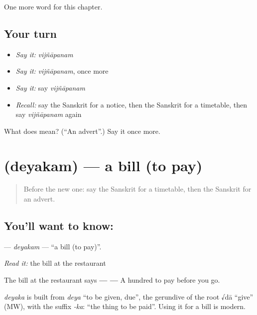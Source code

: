 \begin{grammarlens}[title={What you've built}]
One more word for this chapter.
\end{grammarlens}

\subsection*{Your turn}
\begin{itemize}
\raggedright
  \item \emph{Say it:} \emph{vijñāpanam}
  \item \emph{Say it:} \emph{vijñāpanam}, once more
  \item \emph{Say it:} say \emph{vijñāpanam}
  \item \emph{Recall:} say the Sanskrit for a notice, then the Sanskrit for a timetable, then say \emph{vijñāpanam} again
\end{itemize}

\begin{tcolorbox}[breakable,colback=teal!4,colframe=teal!35!black,title={Before you move on}]
What does  mean? (\textquotedblleft{}An advert\textquotedblright{}.) Say it once more.
\end{tcolorbox}
\section[\texorpdfstring{\sk{देयकम्} (deyakam)}{देयकम् (deyakam)}]{ (deyakam) — a bill (to pay)}

\label{lesson:SA-C140-deyakam}



\begin{quote}
Before the new one: say the Sanskrit for a timetable, then the Sanskrit for an advert.
\end{quote}

\subsection*{You'll want to know: }
\textbf{} — \emph{deyakam} — \textquotedblleft{}a bill (to pay)\textquotedblright{}.

\emph{Read it:} the bill at the restaurant

The bill at the restaurant says \textbf{ —  — } A hundred to pay before you go.

\begin{cousinweb}
\emph{deyaka} is built from \emph{deya} \textquotedblleft{}to be given, due\textquotedblright{}, the gerundive of the root √dā \textquotedblleft{}give\textquotedblright{} (MW), with the suffix \emph{-ka}: \textquotedblleft{}the thing to be paid\textquotedblright{}. Using it for a bill is modern.
\end{cousinweb}

